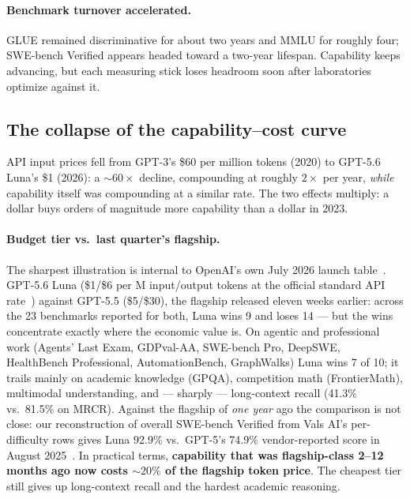 \paragraph{Benchmark turnover accelerated.} GLUE remained discriminative
for about two years and MMLU for roughly four; SWE-bench Verified appears
headed toward a two-year lifespan. Capability keeps advancing, but each
measuring stick loses headroom soon after laboratories optimize against it.

\subsection{The collapse of the capability--cost curve}\label{sec:cost}

API input prices fell from GPT-3's \$60 per million tokens (2020) to GPT-5.6
Luna's \$1 (2026): a ${\sim}60\times$ decline,
compounding at roughly $2\times$ per year, \emph{while} capability itself
was compounding at a similar rate. The two effects multiply: a dollar buys
orders of magnitude more capability than a dollar in 2023.

\paragraph{Budget tier vs.\ last quarter's flagship.} The sharpest illustration
is internal to OpenAI's own July 2026 launch table~\cite{openai2026gpt56}.
GPT-5.6 Luna (\$1/\$6 per M input/output tokens at the official standard API
rate~\cite{openai2026gpt56}) against GPT-5.5 (\$5/\$30), the flagship released
eleven weeks earlier: across the 23 benchmarks reported for both, Luna wins 9
and loses 14 --- but the wins concentrate exactly where the economic value is.
On agentic and professional work (Agents' Last Exam, GDPval-AA, SWE-bench Pro,
DeepSWE, HealthBench Professional, AutomationBench, GraphWalks) Luna wins 7 of
10; it trails mainly on academic knowledge (GPQA), competition math
(FrontierMath), multimodal understanding, and --- sharply --- long-context
recall (41.3\% vs.\ 81.5\% on MRCR). Against the flagship of \emph{one year}
ago the comparison is not close: our reconstruction of overall SWE-bench
Verified from Vals AI's per-difficulty rows gives Luna 92.9\% vs.\ GPT-5's
74.9\% vendor-reported score in August
2025~\cite{vals2026swebench,localaimaster2026gpt55}. In practical terms,
\textbf{capability that was flagship-class 2--12 months ago now costs
${\sim}20\%$ of the flagship token price}. The cheapest tier still gives up
long-context recall and the hardest academic reasoning.

